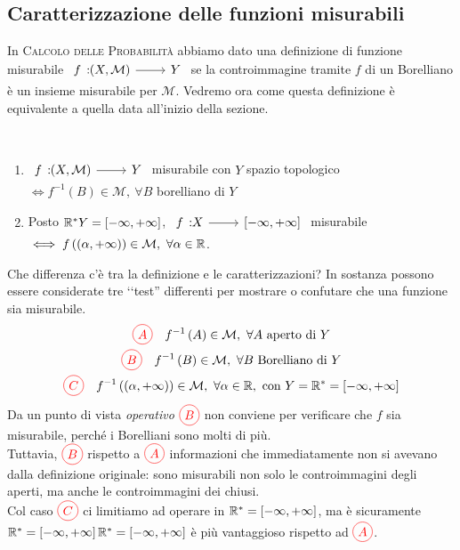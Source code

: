 \subsection{Caratterizzazione delle funzioni misurabili}
In \textsc{Calcolo delle Probabilità} abbiamo dato una definizione di funzione misurabile $\funz{f}{\left(X,\mathcal{M}\right)}{Y}$ se la controimmagine tramite $f$ di un Borelliano è un insieme misurabile per $\mathcal{M}$. Vedremo ora come questa definizione è equivalente a quella data all'inizio della sezione.
\begin{theorema}~{}
	\begin{enumerate}
		\item $\funz{f}{\left(X,\mathcal{M}\right)}{Y}$ misurabile con $Y$ spazio topologico $\iff f^{-1}\left(B\right)\in\mathcal{M},\ \forall B$ borelliano di $Y$
		\item Posto $\mathbb{R}^{\ast}Y=\left[-\infty,+\infty\right]$, $\funz{f}{X}{\left[-\infty,+\infty\right]}$ misurabile $\iff f\left(\left(\alpha,+\infty\right)\right)\in\mathcal{M},\ \forall \alpha\in\mathbb{R}$.
	\end{enumerate}
\end{theorema}
Che differenza c'è tra la definizione e le caratterizzazioni? In sostanza possono essere considerate tre ‘‘test'' differenti per mostrare o confutare che una funzione sia misurabile.
\begin{gather*}
	\textcolor{red}{\circled{A}}\quad f^{-1}\left(A\right)\in\mathcal{M},\ \forall A\text{ aperto di }Y\\
	\textcolor{red}{\circled{B}}\quad f^{-1}\left(B\right)\in\mathcal{M},\ \forall B\text{ Borelliano di }Y\\
	\textcolor{red}{\circled{C}}\quad f^{-1}\left(\left(\alpha,+\infty\right)\right)\in\mathcal{M},\ \forall \alpha\in\realset,\ \text{con }Y=\realset^{\ast}=\left[-\infty,+\infty\right]
\end{gather*}
Da un punto di vista \textit{operativo} $\textcolor{red}{\circled{B}}$ non conviene per verificare che $f$ sia misurabile, perché i Borelliani sono molti di più.\\
Tuttavia, $\textcolor{red}{\circled{B}}$ rispetto a  $\textcolor{red}{\circled{A}}$ informazioni che immediatamente non si avevano dalla definizione originale: sono misurabili non solo le controimmagini degli aperti, ma anche le controimmagini dei chiusi.\\
Col caso $\textcolor{red}{\circled{C}}$ ci limitiamo ad operare in $\mathbb{R}^{\ast}=\left[-\infty,+\infty\right]$, ma è sicuramente $\mathbb{R}^{\ast}=\left[-\infty,+\infty\right]\mathbb{R}^{\ast}=\left[-\infty,+\infty\right]$ è più vantaggioso rispetto ad $\textcolor{red}{\circled{A}}$.